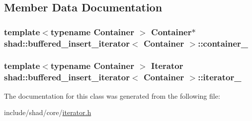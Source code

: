\subsection{Member Data Documentation}
\hypertarget{classshad_1_1buffered__insert__iterator_a9503b8887e7d8c9a911293c96898007c}{
\subsubsection[{container\-\_\-}]{\setlength{\rightskip}{0pt plus 5cm}template$<$typename Container $>$ Container$\ast$ {\bf shad\-::buffered\-\_\-insert\-\_\-iterator}$<$ Container $>$\-::container\-\_\-\hspace{0.3cm}{\ttfamily [protected]}}}\label{classshad_1_1buffered__insert__iterator_a9503b8887e7d8c9a911293c96898007c}
\hypertarget{classshad_1_1buffered__insert__iterator_a47e9e89830c5acbda85c3d6a43cc6713}{
\subsubsection[{iterator\-\_\-}]{\setlength{\rightskip}{0pt plus 5cm}template$<$typename Container $>$ Iterator {\bf shad\-::buffered\-\_\-insert\-\_\-iterator}$<$ Container $>$\-::iterator\-\_\-\hspace{0.3cm}{\ttfamily [protected]}}}\label{classshad_1_1buffered__insert__iterator_a47e9e89830c5acbda85c3d6a43cc6713}


The documentation for this class was generated from the following file\-:\begin{DoxyCompactItemize}
\item 
include/shad/core/\hyperlink{iterator_8h}{iterator.\-h}\end{DoxyCompactItemize}
